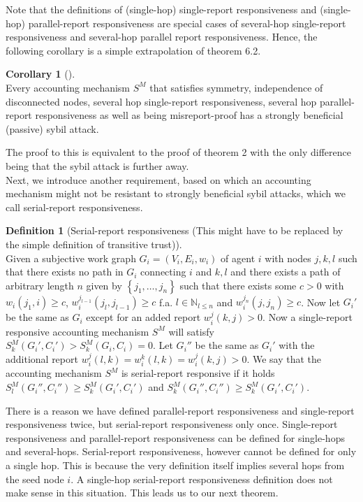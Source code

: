 \documentclass[11pt,a4paper]{article}
\theoremstyle{definition}
\newtheorem{definition}{Definition}[section]
\theoremstyle{theorem}
\theoremstyle{proposition}
\theoremstyle{corollary}
\newtheorem{corollary}{Corollary}[section]
\theoremstyle{lemma}
\theoremstyle{example}
\theoremstyle{remark}
\begin{document}
\noindent{}Note that the definitions of (single-hop) single-report responsiveness and (single-hop) parallel-report responsiveness are special cases of several-hop single-report responsiveness and several-hop parallel report responsiveness. Hence, the following corollary is a simple extrapolation of theorem 6.2.

\begin{corollary}[]\ \\
Every accounting mechanism $S^M$ that satisfies symmetry, independence of disconnected nodes, several hop single-report responsiveness, several hop parallel-report responsiveness as well as being misreport-proof has a strongly beneficial (passive) sybil attack. 
\end{corollary}
\noindent{}The proof to this is equivalent to the proof of theorem 2 with the only difference being that the sybil attack is further away. \vspace{1em}\\

\noindent{}Next, we introduce another requirement, based on which an accounting mechanism might not be resistant to strongly beneficial sybil attacks, which we call serial-report responsiveness.

\begin{definition}[Serial-report responsiveness (This might have to be replaced by the simple definition of transitive trust)]\ \\
Given a subjective work graph $G_i=(V_i,E_i,w_i)$ of agent $i$ with nodes $j,k,l$ such that there exists no path in $G_i$ connecting $i$ and $k,l$ and there exists a path of arbitrary length $n$ given by $\left\lbrace{}j_1,\ldots,j_n\right\rbrace$ such that there exists some $c>0$ with $w_i(j_1,i)\geq{}c$, $w_i^{j_{l-1}}(j_l,j_{l-1})\geq{}c$ f.a. $l\in\mathbb{N}_{l\leq{}n}$ and $w_i^{j_n}(j,j_n)\geq{}c$. Now let $G_i'$ be the same as $G_i$ except for an added report $w_i^j(k,j)>0$. Now a single-report responsive accounting mechanism $S^M$ will satisfy $S^M_k(G_i',C_i')>S^M_k(G_i,C_i)=0$. Let $G_i''$ be the same as $G_i'$ with the additional report $w_i^j(l,k)=w_i^k(l,k)=w_i^j(k,j)>0$. We say that the accounting mechanism $S^M$ is serial-report responsive if it holds $S^M_l(G_i'',C_i'')\geq{}S^M_k(G_i',C_i')$ and $S^M_k(G_i'',C_i'')\geq{}S^M_k(G_i',C_i')$.
\end{definition}

\noindent{}There is a reason we have defined parallel-report responsiveness and single-report responsiveness twice, but serial-report responsiveness only once. Single-report responsiveness and parallel-report responsiveness can be defined for single-hops and several-hops. Serial-report responsiveness, however cannot be defined for only a single hop. This is because the very definition itself implies several hops from the seed node $i$. A single-hop serial-report responsiveness definition does not make sense in this situation. This leads us to our next theorem.\vspace{1em}\\
\end{document}
